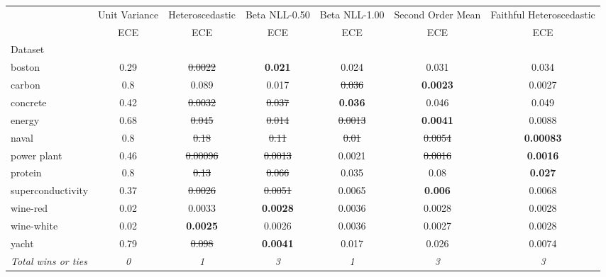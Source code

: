 \begin{tabular}{l|c|c|c|c|c|c}
\toprule
{} & {Unit Variance} & {Heteroscedastic} & {Beta NLL-0.50} & {Beta NLL-1.00} & {Second Order Mean} & {Faithful Heteroscedastic} \\
{} & {ECE} & {ECE} & {ECE} & {ECE} & {ECE} & {ECE} \\
{Dataset} & {} & {} & {} & {} & {} & {} \\
\midrule
boston & 0.29 & \sout{0.0022} & \textbf{0.021} & 0.024 & 0.031 & 0.034 \\
carbon & 0.8 & 0.089 & 0.017 & \sout{0.036} & \textbf{0.0023} & 0.0027 \\
concrete & 0.42 & \sout{0.0032} & \sout{0.037} & \textbf{0.036} & 0.046 & 0.049 \\
energy & 0.68 & \sout{0.045} & \sout{0.014} & \sout{0.0013} & \textbf{0.0041} & 0.0088 \\
naval & 0.8 & \sout{0.18} & \sout{0.11} & \sout{0.01} & \sout{0.0054} & \textbf{0.00083} \\
power plant & 0.46 & \sout{0.00096} & \sout{0.0013} & 0.0021 & \sout{0.0016} & \textbf{0.0016} \\
protein & 0.8 & \sout{0.13} & \sout{0.066} & 0.035 & 0.08 & \textbf{0.027} \\
superconductivity & 0.37 & \sout{0.0026} & \sout{0.0051} & 0.0065 & \textbf{0.006} & 0.0068 \\
wine-red & 0.02 & 0.0033 & \textbf{0.0028} & 0.0036 & 0.0028 & 0.0028 \\
wine-white & 0.02 & \textbf{0.0025} & 0.0026 & 0.0036 & 0.0027 & 0.0028 \\
yacht & 0.79 & \sout{0.098} & \textbf{0.0041} & 0.017 & 0.026 & 0.0074 \\
\textit{{Total wins or ties}} & \textit{0} & \textit{1} & \textit{3} & \textit{1} & \textit{3} & \textit{3} \\
\bottomrule
\end{tabular}
